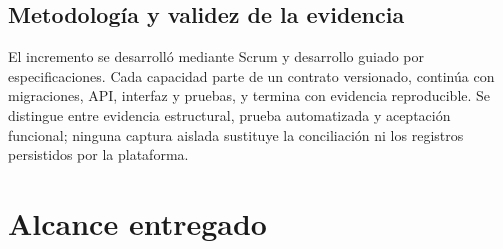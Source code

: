 \documentclass[11pt,letterpaper]{article}
\begin{document}
\subsection{Metodología y validez de la evidencia}

El incremento se desarrolló mediante Scrum y desarrollo guiado por especificaciones. Cada capacidad parte de un contrato versionado, continúa con migraciones, API, interfaz y pruebas, y termina con evidencia reproducible. Se distingue entre evidencia estructural, prueba automatizada y aceptación funcional; ninguna captura aislada sustituye la conciliación ni los registros persistidos por la plataforma.

\section{Alcance entregado}
\end{document}
